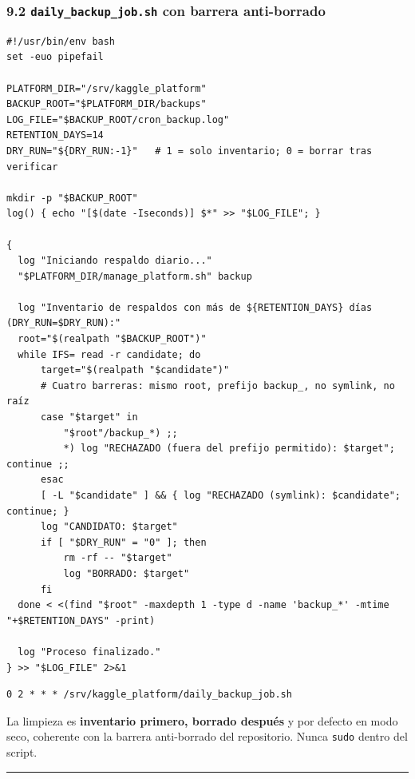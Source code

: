 \documentclass[11pt,a4paper]{article}
\begin{document}
\hypertarget{92-daily_backup_jobsh-con-barrera-anti-borrado}{%
\subsubsection{\texorpdfstring{9.2 \texttt{daily\_\allowbreak{}backup\_\allowbreak{}job.\allowbreak{}sh} con barrera anti-borrado}{9.2 daily\_backup\_job.sh con barrera anti-borrado}}\label{92-daily_backup_jobsh-con-barrera-anti-borrado}}

\begin{lstlisting}
#!/usr/bin/env bash
set -euo pipefail

PLATFORM_DIR="/srv/kaggle_platform"
BACKUP_ROOT="$PLATFORM_DIR/backups"
LOG_FILE="$BACKUP_ROOT/cron_backup.log"
RETENTION_DAYS=14
DRY_RUN="${DRY_RUN:-1}"   # 1 = solo inventario; 0 = borrar tras verificar

mkdir -p "$BACKUP_ROOT"
log() { echo "[$(date -Iseconds)] $*" >> "$LOG_FILE"; }

{
  log "Iniciando respaldo diario..."
  "$PLATFORM_DIR/manage_platform.sh" backup

  log "Inventario de respaldos con más de ${RETENTION_DAYS} días (DRY_RUN=$DRY_RUN):"
  root="$(realpath "$BACKUP_ROOT")"
  while IFS= read -r candidate; do
      target="$(realpath "$candidate")"
      # Cuatro barreras: mismo root, prefijo backup_, no symlink, no raíz
      case "$target" in
          "$root"/backup_*) ;;
          *) log "RECHAZADO (fuera del prefijo permitido): $target"; continue ;;
      esac
      [ -L "$candidate" ] && { log "RECHAZADO (symlink): $candidate"; continue; }
      log "CANDIDATO: $target"
      if [ "$DRY_RUN" = "0" ]; then
          rm -rf -- "$target"
          log "BORRADO: $target"
      fi
  done < <(find "$root" -maxdepth 1 -type d -name 'backup_*' -mtime "+$RETENTION_DAYS" -print)

  log "Proceso finalizado."
} >> "$LOG_FILE" 2>&1
\end{lstlisting}

\begin{lstlisting}
0 2 * * * /srv/kaggle_platform/daily_backup_job.sh
\end{lstlisting}

La limpieza es \textbf{inventario primero, borrado después} y por defecto en modo seco, coherente con la barrera anti-borrado del repositorio. Nunca \texttt{sudo} dentro del script.

\begin{center}\rule{0.5\linewidth}{0.5pt}\end{center}
\end{document}
